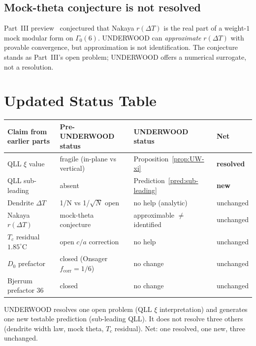 \documentclass[11pt,letterpaper]{article}
\theoremstyle{plain}
\theoremstyle{definition}
\begin{document}
\subsection*{Mock-theta conjecture is not resolved}

Part~III preview~\cite{PartIIIPreview} conjectured that Nakaya
$r(\Delta T)$ is the real part of a weight-$1$ mock modular form on
$\Gamma_0(6)$.  UNDERWOOD can \emph{approximate} $r(\Delta T)$ with
provable convergence, but approximation is not identification.  The
conjecture stands as Part~III's open problem; UNDERWOOD offers a
numerical surrogate, not a resolution.

\section{Updated Status Table}

\begin{center}
\begin{tabular}{@{}llll@{}}
\toprule
Claim from earlier parts & Pre-UNDERWOOD status & UNDERWOOD status & Net \\
\midrule
QLL $\xi$ value     & fragile (in-plane vs vertical) & Proposition~\ref{prop:UW-xi} & \textbf{resolved} \\
QLL sub-leading     & absent                    & Prediction~\ref{pred:sub-leading}  & \textbf{new} \\
Dendrite $\Delta T$ & 1/N vs 1/$\sqrt{N}$ open   & no help (analytic)                & unchanged \\
Nakaya $r(\Delta T)$ & mock-theta conjecture    & approximable $\ne$ identified     & unchanged \\
$T_c$ residual $1.85^\circ$C & open $c/a$ correction & no help                  & unchanged \\
$D_0$ prefactor     & closed (Onsager $f_{\text{corr}}=1/6$) & no change         & unchanged \\
Bjerrum prefactor $36$ & closed                 & no change                         & unchanged \\
\bottomrule
\end{tabular}
\end{center}

UNDERWOOD resolves one open problem (QLL $\xi$ interpretation) and
generates one new testable prediction (sub-leading QLL).  It does
not resolve three others (dendrite width law, mock theta, $T_c$
residual).  Net: one resolved, one new, three unchanged.
\end{document}
